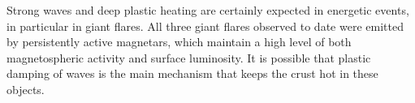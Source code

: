 Strong \alfven waves and deep plastic heating are certainly expected in energetic events, in particular in giant flares. All three giant flares observed to date were emitted by persistently active magnetars, which maintain a high level of both magnetospheric activity and surface luminosity. It is possible that plastic damping of \alfven waves is the main mechanism that keeps the crust hot in these objects.

